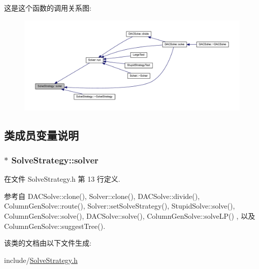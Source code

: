 这是这个函数的调用关系图\+:
\nopagebreak
\begin{figure}[H]
\begin{center}
\leavevmode
\includegraphics[width=350pt]{classSolveStrategy_ad3c3800be3e04570b466c3d8d054c500_icgraph}
\end{center}
\end{figure}




\subsection{类成员变量说明}
\subsubsection[{\texorpdfstring{solver}{solver}}]{$\ast$ Solve\+Strategy\+::solver}\hypertarget{classSolveStrategy_a94d43c47305176d0d3858697d3410443}{}\label{classSolveStrategy_a94d43c47305176d0d3858697d3410443}


在文件 Solve\+Strategy.\+h 第 13 行定义.



参考自 D\+A\+C\+Solve\+::clone(), Solver\+::clone(), D\+A\+C\+Solve\+::divide(), Column\+Gen\+Solve\+::route(), Solver\+::set\+Solve\+Strategy(), Stupid\+Solve\+::solve(), Column\+Gen\+Solve\+::solve(), D\+A\+C\+Solve\+::solve(), Column\+Gen\+Solve\+::solve\+L\+P() , 以及 Column\+Gen\+Solve\+::suggest\+Tree().



该类的文档由以下文件生成\+:\begin{DoxyCompactItemize}
\item 
include/\hyperlink{SolveStrategy_8h}{Solve\+Strategy.\+h}\end{DoxyCompactItemize}
